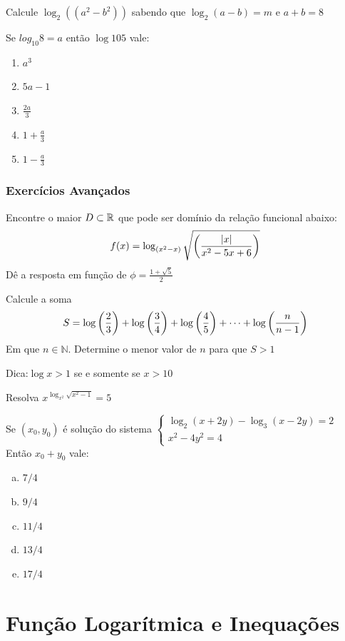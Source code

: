 \begin{exer}[FUVEST] Calcule $\log_2((a^2-b^2))$ sabendo que $\log_2(a-b)=m$ e $a+b=8$
\end{exer}
\begin{exer}[FUVEST] Se $log_{10}8=a$ então $\log{10}5$ vale:
\begin{enumerate}
\item $a^3$
\item $5a-1$
\item $\frac{2a}{3}$
\item $1 + \frac{a}{3}$
\item $1-\frac{a}{3}$
\end{enumerate}
\end{exer}
\subsubsection{Exercícios Avançados}
\begin{exer}Encontre o maior $D\subset \mathbb{R}$ que pode ser domínio da relação funcional abaixo: $$f(x)=\log_{(x^2-x)}{\sqrt{\left ( \frac{|x|}{x^2-5x+6} \right)}}$$Dê a resposta em função de $\phi = \frac{1+\sqrt{5}}{2}$
\end{exer}
\begin{exer} Calcule a soma $$S=\log \left ( \frac{2}{3} \right) + \log \left ( \frac{3}{4} \right)  + \log \left ( \frac{4}{5} \right)  + \dots + \log \left ( \frac{n}{n-1} \right)$$Em que $n \in \mathbb{N}$. Determine o menor valor de $n$ para que $S>1$
\end{exer}
Dica:$\log{x}>1$ se e somente se $x>10$
\begin{exer}[ITA] Resolva $x^{\log_{x^2}{\sqrt{x^2-1}}} = 5$
\end{exer}
\begin{exer}[ITA] Se $(x_0,y_0)$ é solução do sistema
$ \left\{
\begin{array}{ll}
\displaystyle \log_2{(x+2y)} - \log_3{(x-2y)} = 2 \\
\displaystyle x^2-4y^2=4
\end{array}
\right.
$
Então $x_0+y_0$ vale:
\begin{enumerate}[a)]
\item $7/4$
\item $9/4$
\item $11/4$
\item $13/4$
\item $17/4$
\end{enumerate}
\end{exer}
\terminaexer
\section{Função Logarítmica e Inequações}
